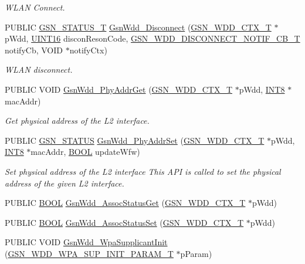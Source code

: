\begin{DoxyCompactItemize}
\begin{DoxyCompactList}\small\item\em WLAN Connect. \end{DoxyCompactList}\item 
PUBLIC \hyperlink{a00659_gae36517c0f5872426a7034c9551eb96ac}{GSN\_\-STATUS\_\-T} \hyperlink{a00677_ga357552985ff387064e0c3feaa21b5808}{GsnWdd\_\-Disconnect} (\hyperlink{a00108}{GSN\_\-WDD\_\-CTX\_\-T} $\ast$pWdd, \hyperlink{a00660_ga09f1a1fb2293e33483cc8d44aefb1eb1}{UINT16} disconResonCode, \hyperlink{a00603_ac5fbb773daa449d33e065683260e253d}{GSN\_\-WDD\_\-DISCONNECT\_\-NOTIF\_\-CB\_\-T} notifyCb, VOID $\ast$notifyCtx)
\begin{DoxyCompactList}\small\item\em WLAN disconnect. \end{DoxyCompactList}\item 
PUBLIC VOID \hyperlink{a00677_ga2de8f5753f24ef1ae1aa69d8afcbf763}{GsnWdd\_\-PhyAddrGet} (\hyperlink{a00108}{GSN\_\-WDD\_\-CTX\_\-T} $\ast$pWdd, \hyperlink{a00660_ga307b8734c020247f6bac4fcde0dcfbb9}{INT8} $\ast$macAddr)
\begin{DoxyCompactList}\small\item\em Get physical address of the L2 interface. \end{DoxyCompactList}\item 
PUBLIC \hyperlink{a00660_gada5951904ac6110b1fa95e51a9ddc217}{GSN\_\-STATUS} \hyperlink{a00677_gaab46be560feac69bcc716ba326b80074}{GsnWdd\_\-PhyAddrSet} (\hyperlink{a00108}{GSN\_\-WDD\_\-CTX\_\-T} $\ast$pWdd, \hyperlink{a00660_ga307b8734c020247f6bac4fcde0dcfbb9}{INT8} $\ast$macAddr, \hyperlink{a00660_ga1f04022c0a182c51c059438790ea138c}{BOOL} updateWfw)
\begin{DoxyCompactList}\small\item\em Set physical address of the L2 interface This API is called to set the physical address of the given L2 interface. \end{DoxyCompactList}\item 
PUBLIC \hyperlink{a00660_ga1f04022c0a182c51c059438790ea138c}{BOOL} \hyperlink{a00603_aade2f710f71d7bfc48ff150b6b85411d}{GsnWdd\_\-AssocStatusGet} (\hyperlink{a00108}{GSN\_\-WDD\_\-CTX\_\-T} $\ast$pWdd)
\item 
PUBLIC \hyperlink{a00660_ga1f04022c0a182c51c059438790ea138c}{BOOL} \hyperlink{a00603_ad29f2b50720c9a351138039c58ffe1de}{GsnWdd\_\-AssocStatusSet} (\hyperlink{a00108}{GSN\_\-WDD\_\-CTX\_\-T} $\ast$pWdd)
\item 
PUBLIC VOID \hyperlink{a00603_a7528c5d281c4ee7e34b720371efdc85f}{GsnWdd\_\-WpaSupplicantInit} (\hyperlink{a00304}{GSN\_\-WDD\_\-WPA\_\-SUP\_\-INIT\_\-PARAM\_\-T} $\ast$pParam)

\end{DoxyCompactItemize}
